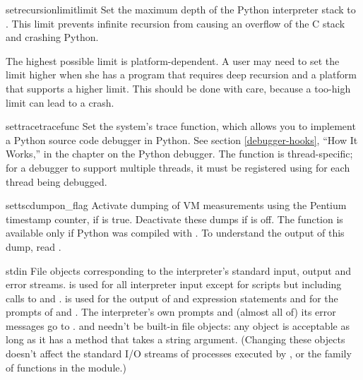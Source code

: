 \begin{funcdesc}{setrecursionlimit}{limit}
  Set the maximum depth of the Python interpreter stack to
  .  This limit prevents infinite recursion from causing an
  overflow of the C stack and crashing Python.

  The highest possible limit is platform-dependent.  A user may need
  to set the limit higher when she has a program that requires deep
  recursion and a platform that supports a higher limit.  This should
  be done with care, because a too-high limit can lead to a crash.
\end{funcdesc}

\begin{funcdesc}{settrace}{tracefunc}
  Set the system's trace function, which allows
  you to implement a Python source code debugger in Python.  See
  section \ref{debugger-hooks}, ``How It Works,'' in the chapter on
  the Python debugger.  The function is
  thread-specific; for a debugger to support multiple threads, it must
  be registered using  for each thread being
  debugged.
\end{funcdesc}

\begin{funcdesc}{settscdump}{on_flag}
  Activate dumping of VM measurements using the Pentium timestamp
  counter, if  is true. Deactivate these dumps if
   is off. The function is available only if Python
  was compiled with . To understand the output
  of this dump, read .

\end{funcdesc}

\begin{datadesc}{stdin}
  File objects corresponding to the interpreter's standard input,
  output and error streams.   is used for all interpreter
  input except for scripts but including calls to
   and
  .   is
  used for the output of  and expression statements and
  for the prompts of  and .
  The interpreter's own prompts and (almost all of) its error messages
  go to .   and  needn't be
  built-in file objects: any object is acceptable as long as it has a
   method that takes a string argument.  (Changing
  these objects doesn't affect the standard I/O streams of processes
  executed by ,  or the
   family of functions in the 
  module.)
\end{datadesc}

